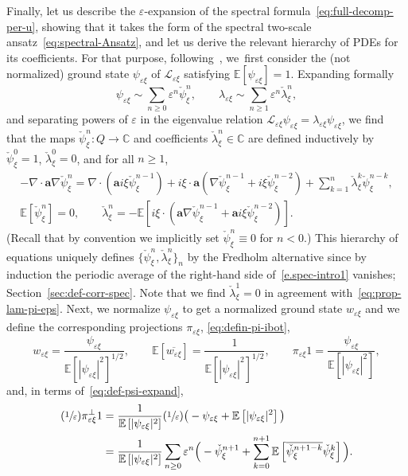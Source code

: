 \documentclass[10pt]{amsart}
\newcommand{\Psfrac}[2]{(\sfrac{#1}{#2})}
\theoremstyle{plain}
\theoremstyle{definition}
\numberwithin{equation}{section}
\newcommand{\e}{\varepsilon}
\newcommand{\Lc}{\mathcal{L}}
\newcommand{\C}{\mathbb C}
\newcommand{\Aa}{\boldsymbol a}
\newcommand{\expec}[1]{\mathbb{E}\left[ #1 \right]}
\begin{document}
Finally, let us describe the $\e$-expansion of the spectral formula~\eqref{eq:full-decomp-per-u}, showing that it takes {the} form of the spectral two-scale ansatz~\eqref{eq:spectral-Ansatz}, and let us derive the relevant hierarchy of PDEs for its coefficients. For that purpose, following~\cite{BG}, we~first consider the (not normalized) ground state $\psi_{\e\xi}$ of $\Lc_{\e\xi}$ satisfying $\expec{\psi_{\e\xi}}=1$.
Expanding {formally}
\begin{equation}\label{eq:def-psi-expand}
\psi_{\e\xi} \sim \sum_{n\ge0}\e^{n}\check\psi^n_\xi, \qquad \lambda_{\e\xi}\sim\sum_{n\ge1} \e^{n}\check\lambda^n_\xi,
\end{equation}
and separating powers of $\e$ in the eigenvalue relation $\Lc_{\e\xi}\psi_{\e\xi}=\lambda_{\e\xi}\psi_{\e\xi}$, we find that the maps $\check \psi^n_\xi:Q \to \C$ and coefficients $\check\lambda^n_\xi \in \C$ are defined inductively by $\check\psi^0_\xi=1$, $\check\lambda^0_\xi=0$, and for all $n\ge1$,
\begin{gather}\label{e.spec-intro1}
-\nabla\cdot\Aa\nabla\check\psi^{n}_\xi=\nabla\cdot(\Aa i\xi \check\psi^{n-1}_\xi)+i\xi\cdot \Aa(\nabla\check\psi^{n-1}_\xi+ i\xi\check\psi^{n-2}_\xi)+\sum_{k=1}^n\check \lambda^k_\xi\check\psi^{n-k}_\xi,\\
\expec{\check\psi^n_\xi}=0,\qquad \check \lambda^n_\xi=-\expec{i\xi\cdot(\Aa\nabla\check\psi^{n-1}_\xi+\Aa i\xi\check\psi^{n-2}_\xi)}.\nonumber
\end{gather}
(Recall that by convention we implicitly set $\check\psi_\xi^{n}\equiv0$ for $n<0$.)
This hierarchy of equations uniquely defines $\{\check\psi_\xi^n,\check\lambda_\xi^n\}_n$ by the Fredholm alternative since by induction the periodic average of the right-hand side of~\eqref{e.spec-intro1} vanishes; \cf Section~\ref{sec:def-corr-spec}. Note that we find $\check\lambda^1_\xi=0$ in agreement with~\eqref{eq:prop-lam-pi-eps}.
Next, we normalize $\psi_{\e\xi}$ to get a normalized ground state $w_{\e\xi}$ and we define the corresponding projections $\pi_{\e\xi}$, \cf \eqref{eq:defin-pi-ibot},
\begin{equation}\label{eq:link-w-psi}
w_{\e \xi}=\frac{\psi_{\e\xi}}{\expec{|\psi_{\e\xi}|^2}^{1/2}}, \qquad \expec{\overline{w_{\e \xi}}}=\frac1{\expec{|\psi_{\e\xi}|^2}^{1/2}},
\qquad\pi_{\e\xi}1=\frac{\psi_{\e\xi}}{\expec{|\psi_{\e\xi}|^2}},
\end{equation}
and, in terms of~\eqref{eq:def-psi-expand},
\begin{equation}\label{eq:expand-pibot1}
\begin{aligned}
\Psfrac1\e\pi^\bot_{\e\xi}1&=\frac{1}{\expec{|\psi_{\e\xi}|^2}}\Psfrac1\e\big(-\psi_{\e\xi}+\expec{|\psi_{\e\xi}|^2}\big)\\
&=\frac1{\expec{|\psi_{\e\xi}|^2}}\sum_{n\ge0}\e^n \Big(-\check\psi^{n+1}_\xi+\sum_{k=0}^{n+1}\expec{\overline{\check\psi^{n+1-k}_\xi}\check\psi^k_\xi}\Big).
\end{aligned}
\end{equation}
\end{document}
